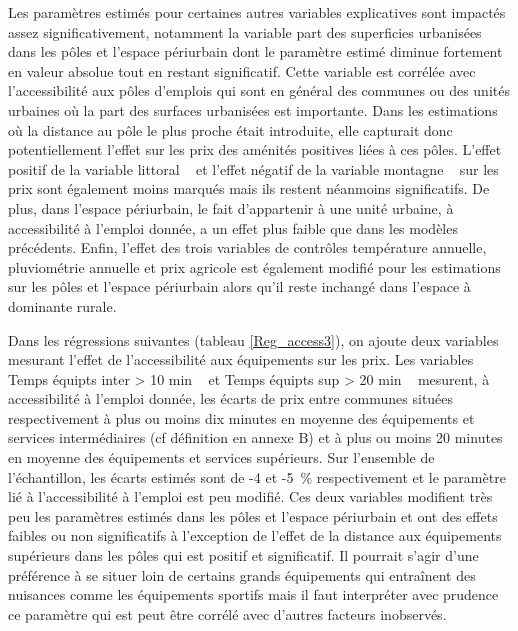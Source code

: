 \documentclass[10.5pt,a4paper]{article}
\begin{document}
{Les paramètres estimés pour certaines autres variables explicatives sont impactés assez significativement, notamment la variable \og part des superficies urbanisées \fg~ dans les pôles et l'espace périurbain dont le paramètre estimé diminue fortement en valeur absolue tout en restant significatif. Cette variable est corrélée avec l'accessibilité aux pôles d'emplois qui sont en général des communes ou des unités urbaines où la part des surfaces urbanisées est importante. Dans les estimations où la distance au pôle le plus proche était introduite, elle capturait donc potentiellement  l'effet sur les prix des aménités positives liées à ces pôles. L'effet positif de la variable \og littoral \fg~  et l'effet négatif de la variable \og montagne \fg~ sur les prix sont également moins marqués mais ils restent néanmoins significatifs. De plus, dans l'espace périurbain, le fait d'appartenir à une unité urbaine, à accessibilité à l'emploi donnée,  a un effet plus faible que dans les modèles précédents. Enfin, l'effet des trois variables de contrôles température annuelle, pluviométrie annuelle et prix agricole est également modifié pour les estimations sur les pôles et l'espace périurbain alors qu'il reste inchangé dans l'espace à dominante rurale. \par

 

Dans les régressions suivantes (tableau \ref{Reg_access3}), on ajoute deux variables mesurant l'effet de l'accessibilité aux équipements sur les prix. Les variables \og Temps équipts inter > 10 min \fg~ et \og Temps équipts sup > 20 min \fg~ mesurent, à accessibilité à l'emploi donnée, les écarts de prix entre communes situées respectivement à plus ou moins dix minutes en moyenne des équipements et services intermédiaires (cf définition en annexe B) et à plus ou moins 20 minutes en moyenne des équipements et services supérieurs. Sur l'ensemble de l'échantillon, les écarts estimés sont de -4 et -5~\% respectivement et le paramètre lié à l'accessibilité à l'emploi est peu modifié. Ces deux variables modifient très peu les paramètres estimés dans les pôles et l'espace périurbain et ont des effets faibles ou non significatifs à l'exception de l'effet de la distance aux équipements supérieurs dans les pôles qui est positif et significatif. Il pourrait s'agir d'une préférence à se situer loin de certains grands équipements qui entraînent des nuisances comme les équipements sportifs mais il faut interpréter avec prudence ce paramètre qui est peut être corrélé avec d'autres facteurs inobservés. \par

}
\end{document}
